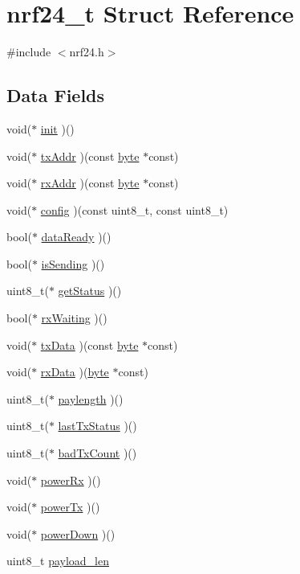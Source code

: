 \hypertarget{a00007}{\section{nrf24\-\_\-t Struct Reference}
\label{a00007}
}


{\ttfamily \#include $<$nrf24.\-h$>$}

\subsection*{Data Fields}
\begin{DoxyCompactItemize}
\item 
void($\ast$ \hyperlink{a00007_a79c441ca7795b1ac62a54c192d3da5c6}{init} )()
\item 
void($\ast$ \hyperlink{a00007_a26bad46d3c1a94c7b197f08a1d4df3bf}{tx\-Addr} )(const \hyperlink{a00011_a82b52bf2b45e214a8f2100ebfdf1aee4}{byte} $\ast$const)
\item 
void($\ast$ \hyperlink{a00007_a633b3f1cbb28dc44cf5cbef3a21e1a52}{rx\-Addr} )(const \hyperlink{a00011_a82b52bf2b45e214a8f2100ebfdf1aee4}{byte} $\ast$const)
\item 
void($\ast$ \hyperlink{a00007_a735fe10ebbd6ad77d4033e79b881aff6}{config} )(const uint8\-\_\-t, const uint8\-\_\-t)
\item 
bool($\ast$ \hyperlink{a00007_a2becf528ece38156c26fcd1ab20fab17}{data\-Ready} )()
\item 
bool($\ast$ \hyperlink{a00007_a3241c78a3f15e752b44460d325f25b83}{is\-Sending} )()
\item 
uint8\-\_\-t($\ast$ \hyperlink{a00007_af429572a8b030785a0419e4cadfaca08}{get\-Status} )()
\item 
bool($\ast$ \hyperlink{a00007_a4b6d281391ba445efcd076d653ce0af4}{rx\-Waiting} )()
\item 
void($\ast$ \hyperlink{a00007_a90fd0d2431d43f6afc45de6ea9524eb1}{tx\-Data} )(const \hyperlink{a00011_a82b52bf2b45e214a8f2100ebfdf1aee4}{byte} $\ast$const)
\item 
void($\ast$ \hyperlink{a00007_a3048d3b01b01b32cbbfb59745cab6e0a}{rx\-Data} )(\hyperlink{a00011_a82b52bf2b45e214a8f2100ebfdf1aee4}{byte} $\ast$const)
\item 
uint8\-\_\-t($\ast$ \hyperlink{a00007_a60f67c05f162a7f816d5032c3dfc66cb}{paylength} )()
\item 
uint8\-\_\-t($\ast$ \hyperlink{a00007_afe102a7f4cbc16b5a6da60b4e8a6d79d}{last\-Tx\-Status} )()
\item 
uint8\-\_\-t($\ast$ \hyperlink{a00007_a920b48080eaef041a9b32b3beae428b5}{bad\-Tx\-Count} )()
\item 
void($\ast$ \hyperlink{a00007_a300889e71dea1fb9d56c564d805604d7}{power\-Rx} )()
\item 
void($\ast$ \hyperlink{a00007_a917c8f18519ee2eb701cb9f5dc06ee5b}{power\-Tx} )()
\item 
void($\ast$ \hyperlink{a00007_a0807619a6863f26e35f2f3d8162c0bc5}{power\-Down} )()
\item 
uint8\-\_\-t \hyperlink{a00007_a169e5d060ccd36a6387c15bb49daf09f}{payload\-\_\-len}
\end{DoxyCompactItemize}


